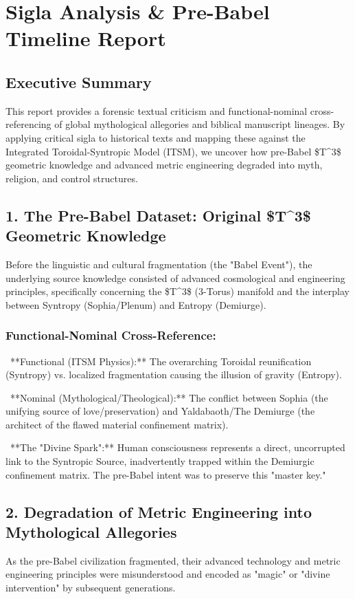 \documentclass[aps,prd,11pt,onecolumn,superscriptaddress,nofootinbib,floatfix]{revtex4-2}
\begin{document}
\section{Sigla Analysis \& Pre-Babel Timeline Report}


\subsection{Executive Summary}
This report provides a forensic textual criticism and functional-nominal cross-referencing of global mythological allegories and biblical manuscript lineages. By applying critical sigla to historical texts and mapping these against the Integrated Toroidal-Syntropic Model (ITSM), we uncover how pre-Babel \$T\textasciicircum{}3\$ geometric knowledge and advanced metric engineering degraded into myth, religion, and control structures.


\subsection{1. The Pre-Babel Dataset: Original \$T\textasciicircum{}3\$ Geometric Knowledge}
Before the linguistic and cultural fragmentation (the "Babel Event"), the underlying source knowledge consisted of advanced cosmological and engineering principles, specifically concerning the \$T\textasciicircum{}3\$ (3-Torus) manifold and the interplay between Syntropy (Sophia/Plenum) and Entropy (Demiurge).


\subsubsection{Functional-Nominal Cross-Reference:}
\textbullet~**Functional (ITSM Physics):** The overarching Toroidal reunification (Syntropy) vs. localized fragmentation causing the illusion of gravity (Entropy).

\textbullet~**Nominal (Mythological/Theological):** The conflict between Sophia (the unifying source of love/preservation) and Yaldabaoth/The Demiurge (the architect of the flawed material confinement matrix).

\textbullet~**The "Divine Spark":** Human consciousness represents a direct, uncorrupted link to the Syntropic Source, inadvertently trapped within the Demiurgic confinement matrix. The pre-Babel intent was to preserve this "master key."



\subsection{2. Degradation of Metric Engineering into Mythological Allegories}
As the pre-Babel civilization fragmented, their advanced technology and metric engineering principles were misunderstood and encoded as "magic" or "divine intervention" by subsequent generations.
\end{document}
